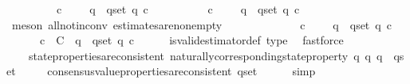 \begin{isabellebody}
\isanewline
\ \ \ \ {\isachardoublequoteopen}{\isacharparenleft}{\isasymexists}\ {\isasymsigma}\ {\isasymin}\ {\isasymSigma}{\isachardot}\ {\isasymforall}\ c\ {\isasymin}\ {\isasymepsilon}\ {\isasymsigma}{\isachardot}\ {\isasymforall}\ q\ {\isasymin}\ q{\isacharunderscore}set{\isachardot}\ q\ c{\isacharparenright}\isanewline
\ \ \ \ {\isasymlongrightarrow}\ {\isacharparenleft}{\isasymexists}\ {\isasymsigma}\ {\isasymin}\ {\isasymSigma}{\isachardot}\ {\isasymexists}\ c\ {\isasymin}\ {\isasymepsilon}\ {\isasymsigma}{\isachardot}\ {\isasymforall}\ q{\isacharprime}\ {\isasymin}\ q{\isacharunderscore}set{\isachardot}\ q{\isacharprime}\ c{\isacharparenright}{\isachardoublequoteclose}\isanewline
\ \ \ \ \isamarkupfalse%
\ {\isacharparenleft}meson\ all{\isacharunderscore}not{\isacharunderscore}in{\isacharunderscore}conv\ estimates{\isacharunderscore}are{\isacharunderscore}non{\isacharunderscore}empty{\isacharparenright}\isanewline
\ \ \isamarkupfalse%
\ \isamarkupfalse%
\isanewline
\ \ \ \ {\isachardoublequoteopen}{\isacharparenleft}{\isasymexists}\ {\isasymsigma}\ {\isasymin}\ {\isasymSigma}{\isachardot}\ {\isasymexists}\ c\ {\isasymin}\ {\isasymepsilon}\ {\isasymsigma}{\isachardot}\ {\isasymforall}\ q\ {\isasymin}\ q{\isacharunderscore}set{\isachardot}\ q\ c{\isacharparenright}\isanewline
\ \ \ \ {\isasymlongrightarrow}\ {\isacharparenleft}{\isasymexists}\ c\ {\isasymin}\ C{\isachardot}\ {\isasymforall}\ q{\isacharprime}\ {\isasymin}\ q{\isacharunderscore}set{\isachardot}\ q{\isacharprime}\ c{\isacharparenright}{\isachardoublequoteclose}\isanewline
\ \ \ \ \isamarkupfalse%
\ is{\isacharunderscore}valid{\isacharunderscore}estimator{\isacharunderscore}def\ {\isasymepsilon}{\isacharunderscore}type\ \isamarkupfalse%
\ fastforce\isanewline
\ \ \isamarkupfalse%
\ \isamarkupfalse%
\isanewline
\ \ \ \ {\isachardoublequoteopen}state{\isacharunderscore}properties{\isacharunderscore}are{\isacharunderscore}consistent\ {\isacharbraceleft}naturally{\isacharunderscore}corresponding{\isacharunderscore}state{\isacharunderscore}property\ q\ {\isacharbar}q{\isachardot}\ q\ {\isasymin}\ q{\isacharunderscore}set{\isacharbraceright}\isanewline
\ \ \ \ {\isasymLongrightarrow}\ consensus{\isacharunderscore}value{\isacharunderscore}properties{\isacharunderscore}are{\isacharunderscore}consistent\ q{\isacharunderscore}set{\isachardoublequoteclose}\isanewline
\ \ \ \ \isamarkupfalse%
\ simp\isanewline
{}\isamarkupfalse%
%
\endisatagproof

\end{isabellebody}
